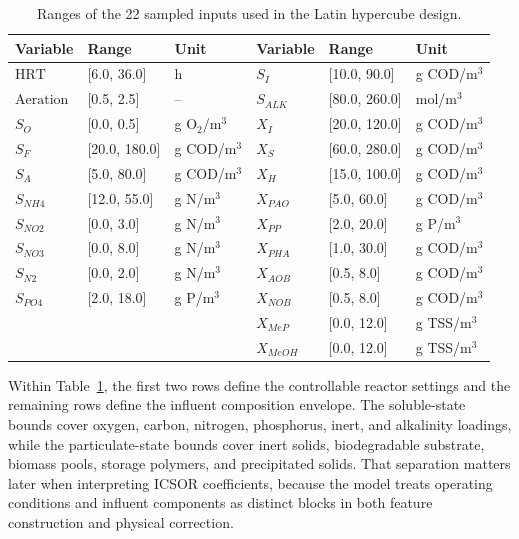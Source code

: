 \documentclass[a4paper,fleqn]{cas-sc}
\newenvironment{revblock}{\begingroup\color{revDefault}}{\endgroup}
\newenvironment{revblockr116}{\begingroup\color{revRoneSixteen}}{\endgroup}
\begin{document}
\begin{revblock}
\begin{table}[htbp]
\centering
\caption{Ranges of the 22 sampled inputs used in the Latin hypercube design.}
\label{tab:simulation_domain}
\scriptsize
\setlength{\tabcolsep}{4pt}
\begin{tabular}{lll|lll}
\hline
Variable & Range & Unit & Variable & Range & Unit \\
\hline
$\mathrm{HRT}$ & [6.0, 36.0] & h & $S_I$ & [10.0, 90.0] & g COD/m$^3$ \\
$\mathrm{Aeration}$ & [0.5, 2.5] & -- & $S_{ALK}$ & [80.0, 260.0] & mol/m$^3$ \\
$S_O$ & [0.0, 0.5] & g O$_2$/m$^3$ & $X_I$ & [20.0, 120.0] & g COD/m$^3$ \\
$S_F$ & [20.0, 180.0] & g COD/m$^3$ & $X_S$ & [60.0, 280.0] & g COD/m$^3$ \\
$S_A$ & [5.0, 80.0] & g COD/m$^3$ & $X_H$ & [15.0, 100.0] & g COD/m$^3$ \\
$S_{NH4}$ & [12.0, 55.0] & g N/m$^3$ & $X_{PAO}$ & [5.0, 60.0] & g COD/m$^3$ \\
$S_{NO2}$ & [0.0, 3.0] & g N/m$^3$ & $X_{PP}$ & [2.0, 20.0] & g P/m$^3$ \\
$S_{NO3}$ & [0.0, 8.0] & g N/m$^3$ & $X_{PHA}$ & [1.0, 30.0] & g COD/m$^3$ \\
$S_{N2}$ & [0.0, 2.0] & g N/m$^3$ & $X_{AOB}$ & [0.5, 8.0] & g COD/m$^3$ \\
$S_{PO4}$ & [2.0, 18.0] & g P/m$^3$ & $X_{NOB}$ & [0.5, 8.0] & g COD/m$^3$ \\
 &  &  & $X_{MeP}$ & [0.0, 12.0] & g TSS/m$^3$ \\
 &  &  & $X_{MeOH}$ & [0.0, 12.0] & g TSS/m$^3$ \\
\hline
\end{tabular}
\end{table}

Within Table~\ref{tab:simulation_domain}, the first two rows define the controllable reactor settings and the remaining rows define the influent composition envelope. The soluble-state bounds cover oxygen, carbon, nitrogen, phosphorus, inert, and alkalinity loadings, while the particulate-state bounds cover inert solids, biodegradable substrate, biomass pools, storage polymers, and precipitated solids. That separation matters later when interpreting ICSOR coefficients, because the model treats operating conditions and influent components as distinct blocks in both feature construction and physical correction.

\begin{revblockr116}

\end{revblockr116}
\end{revblock}
\end{document}
